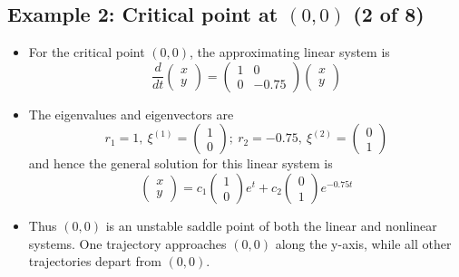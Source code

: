 \documentclass[11pt,a4paper]{article}
\begin{document}
	\subsection*{Example 2: Critical point at $(0,0)$ (2 of 8)}
	\begin{itemize}
		\item For the critical point $(0,0)$, the approximating linear system is
		$$
		\frac{d}{dt}
		\begin{pmatrix}
			x\\
			y
		\end{pmatrix}=
		\begin{pmatrix}
			1 & 0\\
			0 & -0.75
		\end{pmatrix}
		\begin{pmatrix}
			x \\
			y
		\end{pmatrix}
		$$
		\item The eigenvalues and eigenvectors are
		$$
		r_1 = 1,\ \xi^{(1)} =
		\begin{pmatrix}
			1\\
			0
		\end{pmatrix};\ r_2 = -0.75,\ \xi^{(2)}=
		\begin{pmatrix}
			0\\
			1
		\end{pmatrix}
		$$
		and hence the general solution for this linear system is
		$$
		\begin{pmatrix}
			x\\
			y
		\end{pmatrix} = c_1
		\begin{pmatrix}
			1\\
			0
		\end{pmatrix}e^t + c_2
		\begin{pmatrix}
			0\\
			1
		\end{pmatrix}e^{-0.75t}
		$$
		\item Thus $(0,0)$ is an unstable saddle point of both the linear and nonlinear systems. One trajectory approaches $(0,0)$ along the y-axis, while all other trajectories depart from $(0,0)$.
	\end{itemize}
\end{document}
